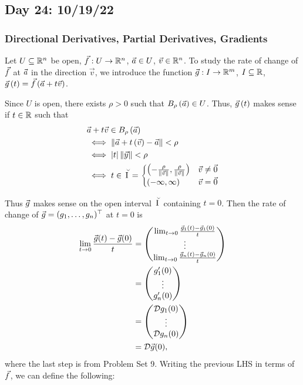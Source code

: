\documentclass[main.tex]{subfiles}
\begin{document}
\subsection{Day 24: 10/19/22}
\subsubsection{Directional Derivatives, Partial Derivatives, Gradients}

Let $U\subseteq \mathbb R^n$ be open, $\vec{f} : U\to \mathbb R^n$, $\vec{a}\in U$, $\vec{v}\in \mathbb R^n$. To study the rate of change of $\vec{f}$ at $\vec{a}$ in the direction $\vec{v}$, we introduce the function $\vec{g} : I\to \mathbb R^m$, $I\subseteq \mathbb R$, $\vec{g}\left( t \right) = \vec{f}\left( \vec{a} + t\vec{v} \right)$.

Since $U$ is open, there exists $\rho > 0$ such that $B_\rho\left( \vec{a} \right)\in U$. Thus, $\vec{g}\left( t \right)$ makes sense if $t\in \mathbb R$ such that
\begin{align*}
    &\va + t\vec{v}\in B_\rho\parens{\va} \\
    &\iff \norm{\va + t\parens{\vec{v}} - \va} < \rho \\
    &\iff \abs{t}\norm{\vec{y}} < \rho \\
    &\iff t\in \smhat{I} = \begin{cases}
        \parens{-\frac{\rho}{\norm{\vec{v}}}, \frac{\rho}{\norm{\vec{v}}}} & \vec{v} \neq \vec{0} \\
        (-\infty, \infty) & \vec{v} = \vec{0} \\
    \end{cases}
\end{align*}

Thus $\vec{g}$ makes sense on the open interval $\smhat{I}$ containing $t = 0$. Then the rate of change of $\vec{g} = (g_1, \ldots , g_n)^\top$ at $t = 0$ is
\begin{align*}
    \lim_{t\to 0} \frac{\vec{g}(t) - \vec{g}(0)}{t} &= \begin{pmatrix}
        \lim_{t\to 0} \frac{\vec{g}_1(t) - \vec{g}_1(0)}{t} \\
        \vdots \\
        \lim_{t\to 0} \frac{\vec{g}_n(t) - \vec{g}_n(0)}{t}
    \end{pmatrix} \\
    &= \begin{pmatrix}
        g_1'(0) \\
        \vdots \\
        g_n'(0)
    \end{pmatrix} \\
    &= \begin{pmatrix}
        \mathcal{D}g_1(0) \\
        \vdots \\
        \mathcal{D}g_n(0)
    \end{pmatrix} \\
    &= \mathcal{D}\vec{g}(0),
\end{align*}
where the last step is from Problem Set 9. Writing the previous LHS in terms of $\vec{f}$, we can define the following:
\end{document}
